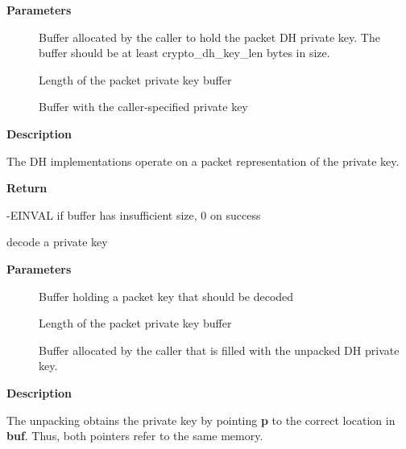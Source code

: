 \documentclass[a4paper,8pt,english]{sphinxmanual}
\begin{document}
\textbf{Parameters}
\begin{description}
\item[{}] \leavevmode
Buffer allocated by the caller to hold the packet DH
private key. The buffer should be at least crypto\_dh\_key\_len
bytes in size.

\item[{}] \leavevmode
Length of the packet private key buffer

\item[{}] \leavevmode
Buffer with the caller-specified private key

\end{description}

\textbf{Description}

The DH implementations operate on a packet representation of the private
key.

\textbf{Return}

-EINVAL if buffer has insufficient size, 0 on success

\begin{fulllineitems}
\label{crypto/api-kpp:c.crypto_dh_decode_key}
decode a private key

\end{fulllineitems}


\textbf{Parameters}
\begin{description}
\item[{}] \leavevmode
Buffer holding a packet key that should be decoded

\item[{}] \leavevmode
Length of the packet private key buffer

\item[{}] \leavevmode
Buffer allocated by the caller that is filled with the
unpacked DH private key.

\end{description}

\textbf{Description}

The unpacking obtains the private key by pointing \textbf{p} to the correct location
in \textbf{buf}. Thus, both pointers refer to the same memory.
\end{document}
